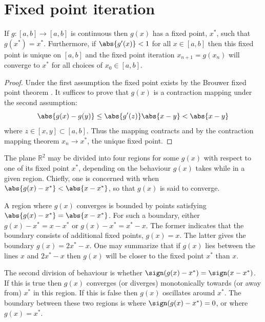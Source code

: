 \documentclass{article}
\begin{document}
\section{Fixed point iteration}
\label{sec:fpi}

\begin{thm}
If $g:[a,b] \to [a,b]$ is continuous then $g(x)$ has a fixed point, $x^*$, such that $g(x^*) = x^*$.
Furthermore, if $\abs{g'(x)} < 1$ for all $x \in [a,b]$ then this fixed point is unique on $[a,b]$ and the fixed point iteration $x_{n+1} = g(x_n)$ will converge to $x^*$ for all choices of $x_0 \in [a,b]$.
\end{thm}

\begin{proof}
Under the first assumption the fixed point exists by the Brouwer fixed point theorem \cite{suli2003introduction}.
It suffices to prove that $g(x)$ is a contraction mapping \cite{suli2003introduction} under the second assumption:
\begin{equation*}
\abs{g(x) - g(y)} \leq \abs{g'(z)} \abs{x - y} < \abs{x-y}
\end{equation*}
where $z \in [x,y] \subset [a,b]$.
Thus the mapping contracts and by the contraction mapping theorem $x_n \to x^*$, the unique fixed point.
\end{proof}

The plane $\mathbb{R}^2$ may be divided into four regions for some $g(x)$ with respect to one of its fixed point $x^*$, depending on the behaviour $g(x)$ takes while in a given region.
Chiefly, one is concerned with when $\abs{g(x) - x^*} < \abs{x - x^*}$, so that $g(x)$ is said to converge.

A region where $g(x)$ converges is bounded by points satisfying $\abs{g(x) - x^*} = \abs{x - x^*}$.
For such a boundary, either $g(x) - x^* = x - x^*$ or $g(x) - x^* = x^* - x$.
The former indicates that the boundary consists of additional fixed points, $g(x) = x$.
The latter gives the boundary $g(x) = 2x^* - x$.
One may summarize that if $g(x)$ lies between the lines $x$ and $2x^* - x$ then $g(x)$ will be closer to the fixed point $x^*$ than $x$.

The second division of behaviour is whether $\sign(g(x) - x^*) = \sign(x - x^*)$.
If this is true then $g(x)$ converges (or diverges) monotonically towards (or away from) $x^*$ in this region.
If this is false then $g(x)$ oscillates around $x^*$.
The boundary between these two regions is where $\sign(g(x) - x^*) = 0$, or where $g(x) = x^*$.
\end{document}
